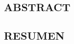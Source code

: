 



\vspace*{0.5in}
\begin{center}
\section*{ABSTRACT}
\end{center}

\noindent
\blindtext







\newpage





\vspace*{0.5in}
\begin{center}
\section*{RESUMEN}
\end{center}

\noindent
\blindtext %
